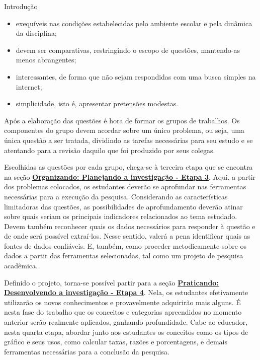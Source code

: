 \begin{apresentacao}{Introdução}
\begin{itemize}
\item exequíveis nas condições estabelecidas pelo ambiente escolar e pela dinâmica da disciplina;

\item devem ser comparativas, restringindo o escopo de questões, mantendo-as menos abrangentes;

\item interessantes, de forma que não sejam respondidas com uma busca simples na internet;

\item simplicidade, isto é, apresentar pretensões modestas.
\end{itemize}

Após a elaboração das questões é hora de formar os grupos de trabalhos. Os componentes do grupo devem acordar sobre um único problema, ou seja, uma única questão a ser tratada, dividindo as tarefas necessárias para seu estudo e se atentando para a revisão daquilo que foi produzido por seus colegas.

Escolhidas as questões por cada grupo, chega-se à terceira etapa que se encontra na seção \hyperref[etapa3]{\textcolor{session4}{\textbf{Organizando: Planejando a investigação - Etapa 3}}}. Aqui, a partir dos problemas colocados, os estudantes deverão se aprofundar nas ferramentas necessárias para a execução da pesquisa. Considerando as características limitadoras das questões, as possibilidades de aprofundamento deverão atinar sobre quais seriam os principais indicadores relacionados ao tema estudado. Devem também reconhecer quais os dados necessários para responder à questão e de onde será possível extraí-los. Nesse sentido, valerá a pena identificar quais as fontes de dados confiáveis. E, também, como proceder metodicamente sobre os dados a partir das ferramentas selecionadas, tal como um projeto de pesquisa acadêmica.

Definido o projeto, torna-se possível partir para a seção \hyperref[etapa4]{\textcolor{session2}{\textbf{Praticando: Desenvolvendo a investigação - Etapa 4}}}. Nela, os estudantes efetivamente utilizarão os novos conhecimentos e provavelmente adquirirão mais alguns. É nesta fase do trabalho que os conceitos e categorias apreendidos no momento anterior serão realmente aplicados, ganhando profundidade. Cabe ao educador, nesta quarta etapa, abordar junto aos estudantes os conceitos como os tipos de gráfico e seus usos, como calcular taxas, razões e porcentagens, e demais ferramentas necessárias para a conclusão da pesquisa.


\end{apresentacao}
